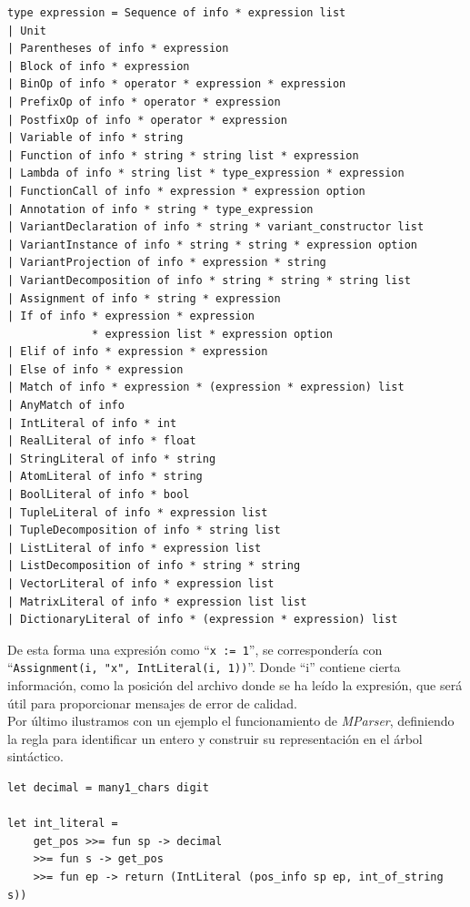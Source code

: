 \begin{lstlisting}[style=ocaml]
type expression = Sequence of info * expression list
| Unit
| Parentheses of info * expression
| Block of info * expression
| BinOp of info * operator * expression * expression
| PrefixOp of info * operator * expression
| PostfixOp of info * operator * expression
| Variable of info * string
| Function of info * string * string list * expression
| Lambda of info * string list * type_expression * expression
| FunctionCall of info * expression * expression option
| Annotation of info * string * type_expression
| VariantDeclaration of info * string * variant_constructor list
| VariantInstance of info * string * string * expression option
| VariantProjection of info * expression * string
| VariantDecomposition of info * string * string * string list
| Assignment of info * string * expression
| If of info * expression * expression
             * expression list * expression option
| Elif of info * expression * expression
| Else of info * expression
| Match of info * expression * (expression * expression) list
| AnyMatch of info
| IntLiteral of info * int
| RealLiteral of info * float
| StringLiteral of info * string
| AtomLiteral of info * string
| BoolLiteral of info * bool
| TupleLiteral of info * expression list
| TupleDecomposition of info * string list
| ListLiteral of info * expression list
| ListDecomposition of info * string * string
| VectorLiteral of info * expression list
| MatrixLiteral of info * expression list list
| DictionaryLiteral of info * (expression * expression) list
\end{lstlisting}

De esta forma una expresión como ``\lstinline[style=tail]{x := 1}'', se correspondería con\\ ``\mbox{\lstinline[style=ocaml]{Assignment(i, "x", IntLiteral(i, 1))}}''. Donde ``i'' contiene cierta información, como la posición del archivo donde se ha leído la expresión, que será útil para proporcionar mensajes de error de calidad.\\

Por último ilustramos con un ejemplo el funcionamiento de \textit{MParser}, definiendo la regla para identificar un entero y construir su representación en el árbol sintáctico.\\

\begin{lstlisting}[style=ocaml]
let decimal = many1_chars digit

let int_literal =
	get_pos >>= fun sp -> decimal
	>>= fun s -> get_pos
	>>= fun ep -> return (IntLiteral (pos_info sp ep, int_of_string s))
\end{lstlisting}

